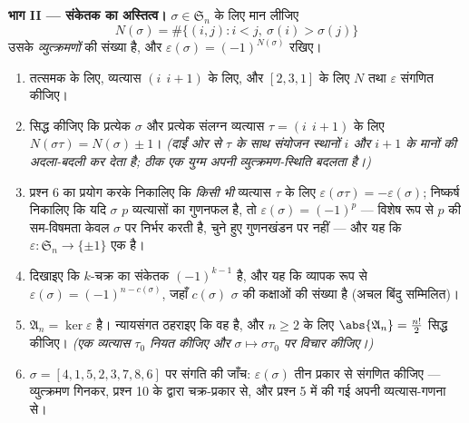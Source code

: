 \begin{problem}
\medskip \noindent\textbf{भाग II --- संकेतक का अस्तित्व।} $\sigma \in
\mathfrak S_n$ के लिए मान लीजिए
\[
N(\sigma) = \#\bigl\{(i, j) : i < j,\ \sigma(i) >
\sigma(j)\bigr\}
\]
उसके \emph{व्युत्क्रमणों} की संख्या है, और $\varepsilon(\sigma) =
(-1)^{N(\sigma)}$ रखिए।
\begin{enumerate}[resume]
  \item तत्समक के लिए, व्यत्यास $(i\ \ i{+}1)$ के लिए, और $[2, 3, 1]$ के लिए
  $N$ तथा $\varepsilon$ संगणित कीजिए।
  \item सिद्ध कीजिए कि प्रत्येक $\sigma$ और प्रत्येक संलग्न व्यत्यास $\tau =
  (i\ \ i{+}1)$ के लिए $N(\sigma\tau) = N(\sigma) \pm 1$। \emph{(दाईं ओर से
  $\tau$ के साथ संयोजन स्थानों $i$ और $i + 1$ के मानों की अदला-बदली कर देता
  है; ठीक एक युग्म अपनी व्युत्क्रमण-स्थिति बदलता है।)}
  \item प्रश्न 6 का प्रयोग करके निकालिए कि \emph{किसी भी} व्यत्यास $\tau$ के
  लिए $\varepsilon(\sigma\tau) = -\varepsilon(\sigma)$; निष्कर्ष निकालिए कि
  यदि $\sigma$ $p$ व्यत्यासों का गुणनफल है, तो $\varepsilon(\sigma) =
  (-1)^p$ --- विशेष रूप से $p$ की सम-विषमता केवल $\sigma$ पर निर्भर करती है,
  चुने हुए गुणनखंडन पर नहीं --- और यह कि $\varepsilon \colon \mathfrak S_n
  \to \{\pm 1\}$ एक   है।
  \item दिखाइए कि $k$-चक्र का संकेतक $(-1)^{k-1}$ है, और यह कि व्यापक रूप से
  $\varepsilon(\sigma) = (-1)^{n - c(\sigma)}$, जहाँ $c(\sigma)$ $\sigma$ की
  कक्षाओं की संख्या है (अचल बिंदु सम्मिलित)।
  \item \emph{} $\mathfrak A_n = \ker\varepsilon$ है।
  न्यायसंगत ठहराइए कि वह  है, और $n \geq 2$ के लिए $\abs{\mathfrak
  A_n} = \frac{n!}2$ सिद्ध कीजिए। \emph{(एक व्यत्यास $\tau_0$ नियत कीजिए और
  $\sigma \mapsto \sigma\tau_0$ पर विचार कीजिए।)}
  \item $\sigma = [4, 1, 5, 2, 3, 7, 8, 6]$ पर संगति की जाँच:
  $\varepsilon(\sigma)$ तीन प्रकार से संगणित कीजिए --- व्युत्क्रमण गिनकर,
  प्रश्न 10 के द्वारा चक्र-प्रकार से, और प्रश्न 5 में की गई अपनी
  व्यत्यास-गणना से।
\end{enumerate}


\end{problem}
